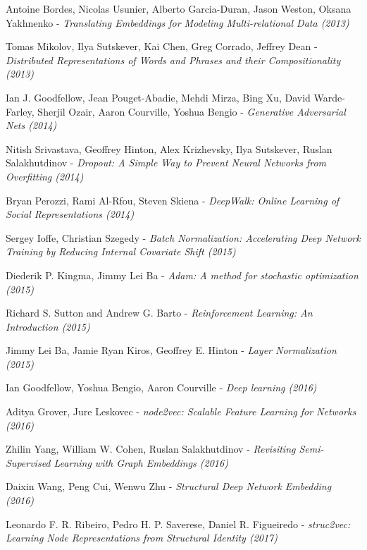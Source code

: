 \documentclass[longabstract, english, mgr]{iithesis}
\theoremstyle{default_theorem_style}\newtheorem{theorem}{Theorem}
\theoremstyle{default_theorem_style}\newtheorem{definition}{Definition}
\begin{document}
\begin{thebibliography}{99}

Antoine Bordes, Nicolas Usunier, Alberto Garcia-Duran, Jason Weston, Oksana Yakhnenko - \textit{Translating Embeddings
for Modeling Multi-relational Data (2013)}

Tomas Mikolov, Ilya Sutskever, Kai Chen, Greg Corrado, Jeffrey Dean - \textit{Distributed Representations of
Words and Phrases and their Compositionality (2013)}

Ian J. Goodfellow, Jean Pouget-Abadie, Mehdi Mirza, Bing Xu, David Warde-Farley, Sherjil Ozair, Aaron Courville,
Yoshua Bengio - \textit{Generative Adversarial Nets (2014)}

Nitish Srivastava, Geoffrey Hinton, Alex Krizhevsky, Ilya Sutskever, Ruslan Salakhutdinov - \textit{Dropout: A
Simple Way to Prevent Neural Networks from Overfitting (2014)}

Bryan Perozzi, Rami Al-Rfou, Steven Skiena - \textit{DeepWalk: Online Learning of Social Representations (2014)}

Sergey Ioffe, Christian Szegedy - \textit{Batch Normalization: Accelerating Deep Network Training by
Reducing Internal Covariate Shift (2015)}

Diederik P. Kingma, Jimmy Lei Ba - \textit{Adam: A method for stochastic optimization (2015)}

Richard S. Sutton and Andrew G. Barto - \textit{Reinforcement Learning: An Introduction (2015)}

Jimmy Lei Ba, Jamie Ryan Kiros, Geoffrey E. Hinton - \textit{Layer Normalization (2015)}

Ian Goodfellow, Yoshua Bengio, Aaron Courville - \textit{Deep learning (2016)}

Aditya Grover, Jure Leskovec - \textit{node2vec: Scalable Feature Learning for Networks (2016)}

Zhilin Yang, William W. Cohen, Ruslan Salakhutdinov - \textit{
Revisiting Semi-Supervised Learning with Graph Embeddings (2016)}

Daixin Wang, Peng Cui, Wenwu Zhu - \textit{Structural Deep Network Embedding (2016)}

Leonardo F. R. Ribeiro, Pedro H. P. Saverese, Daniel R. Figueiredo - \textit{struc2vec: Learning Node
Representations from Structural Identity (2017)}


\end{thebibliography}
\end{document}
